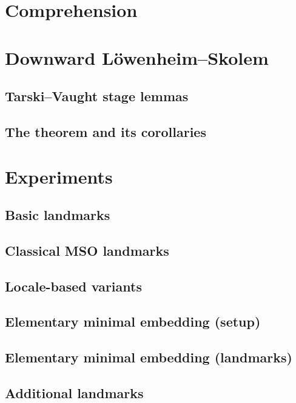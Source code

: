 \documentclass[11pt,a4paper]{article}
\begin{document}
\section{Comprehension}


\section{Downward L\"owenheim--Skolem}
\subsection{Tarski--Vaught stage lemmas}

\subsection{The theorem and its corollaries}


\section{Experiments}
\subsection{Basic landmarks}

\subsection{Classical MSO landmarks}

\subsection{Locale-based variants}

\subsection{Elementary minimal embedding (setup)}

\subsection{Elementary minimal embedding (landmarks)}

\subsection{Additional landmarks}




\end{document}
